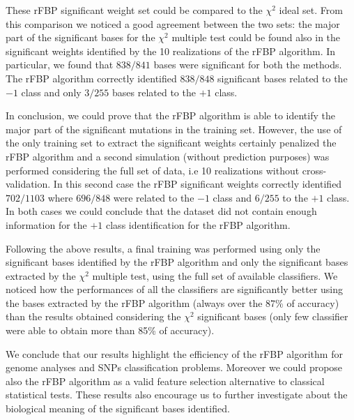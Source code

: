 \documentclass{standalone}
\begin{document}
These rFBP significant weight set could be compared to the $\chi^2$ ideal set.
From this comparison we noticed a good agreement between the two sets: the major part of the significant bases for the $\chi^2$ multiple test could be found also in the significant weights identified by the 10 realizations of the rFBP algorithm.
In particular, we found that $838/841$ bases were significant for both the methods.
The rFBP algorithm correctly identified $838/848$ significant bases related to the $-1$ class and only $3/255$ bases related to the $+1$ class.

In conclusion, we could prove that the rFBP algorithm is able to identify the major part of the significant mutations in the training set.
However, the use of the only training set to extract the significant weights certainly penalized the rFBP algorithm and a second simulation (without prediction purposes) was performed considering the full set of data, i.e 10 realizations without cross-validation.
In this second case the rFBP significant weights correctly identified $702/1103$ where $696/848$ were related to the $-1$ class and $6/255$ to the $+1$ class.
In both cases we could conclude that the dataset did not contain enough information for the $+1$ class identification for the rFBP algorithm.

Following the above results, a final training was performed using only the significant bases identified by the rFBP algorithm and only the significant bases extracted by the $\chi^2$ multiple test, using the full set of available classifiers.
We noticed how the performances of all the classifiers are significantly better using the bases extracted by the rFBP algorithm (always over the 87\% of accuracy) than the results obtained considering the $\chi^2$ significant bases (only few classifier were able to obtain more than 85\% of accuracy).

We conclude that our results highlight the efficiency of the rFBP algorithm for genome analyses and SNPs classification problems.
Moreover we could propose also the rFBP algorithm as a valid feature selection alternative to classical statistical tests.
These results also encourage us to further investigate about the biological meaning of the significant bases identified.
\end{document}
